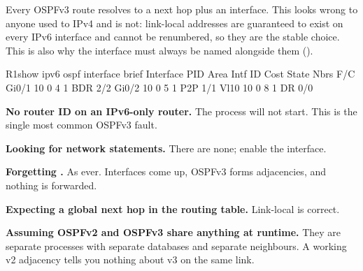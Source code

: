 \begin{alertbox}
Every OSPFv3 route resolves to a  next hop plus an interface. This
looks wrong to anyone used to IPv4 and is not: link-local addresses are
guaranteed to exist on every IPv6 interface and cannot be renumbered, so they are
the stable choice. This is also why the interface must always be named alongside
them ().
\end{alertbox}

\begin{verify}{R1}{show ipv6 ospf interface brief}
Interface    PID   Area            Intf ID    Cost  State Nbrs F/C
Gi0/1        10    0               4          1     BDR   2/2
Gi0/2        10    0               5          1     P2P   1/1
Vl10         10    0               8          1     DR    0/0
\end{verify}

\begin{pitfall}
\begin{tight}
  \item \textbf{No router ID on an IPv6-only router.} The process will not start.
        This is the single most common OSPFv3 fault.
  \item \textbf{Looking for network statements.} There are none; enable the
        interface.
  \item \textbf{Forgetting .} As ever. Interfaces come
        up, OSPFv3 forms adjacencies, and nothing is forwarded.
  \item \textbf{Expecting a global next hop in the routing table.} Link-local is
        correct.
  \item \textbf{Assuming OSPFv2 and OSPFv3 share anything at runtime.} They are
        separate processes with separate databases and separate neighbours. A
        working v2 adjacency tells you nothing about v3 on the same link.
\end{tight}
\end{pitfall}

